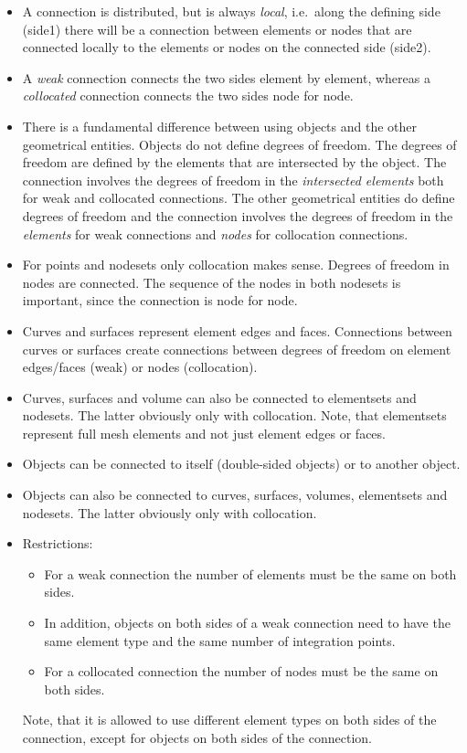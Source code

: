 \begin{itemize}
\item   
A connection
is distributed, but is always \emph{local}, i.e.\ along the
defining side (side1) there will be a connection between elements or nodes that
are connected locally to the elements or nodes on the connected side (side2).
\item A \emph{weak} connection connects the two sides element by element,
whereas a \emph{collocated} connection connects the two sides node for node.
\item There is a fundamental difference between using objects and the other
geometrical entities.
Objects do not define degrees of freedom. The degrees of freedom are
defined by the elements that are intersected by the object. The connection
involves the degrees of freedom in the
\emph{intersected elements} both for weak and collocated
connections. The other geometrical entities
do define degrees of freedom and the connection involves the degrees of
freedom in the \emph{elements} for weak connections and \emph{nodes} for
collocation connections.
\item For points and nodesets only collocation makes sense. Degrees of freedom
in nodes are connected. The sequence of the nodes in both nodesets is
important, since the connection is node for node.
\item Curves and surfaces represent element edges and faces. Connections
between curves or surfaces create connections between degrees of freedom on
element edges/faces (weak) or nodes (collocation).
\item Curves, surfaces and volume can also be connected to elementsets and
nodesets. The latter obviously only with collocation.
Note, that elementsets represent full mesh elements and not just
element edges or faces. 
\item Objects can be connected to itself (double-sided objects) or to another
object.
\item Objects can also be connected to curves, surfaces, volumes,
 elementsets and nodesets. The latter obviously only with collocation. 
\item Restrictions:
\begin{itemize}
   \item For a weak connection the number of elements must be the same on both
         sides.
   \item In addition, objects on both sides of a weak connection need to have
         the same element type and the same number of integration points.
   \item For a collocated connection the number of nodes must be the same on
         both sides.
\end{itemize}
Note, that it is allowed to use different element types on both sides of the
connection, except for objects on both sides of the connection.
\end{itemize}

